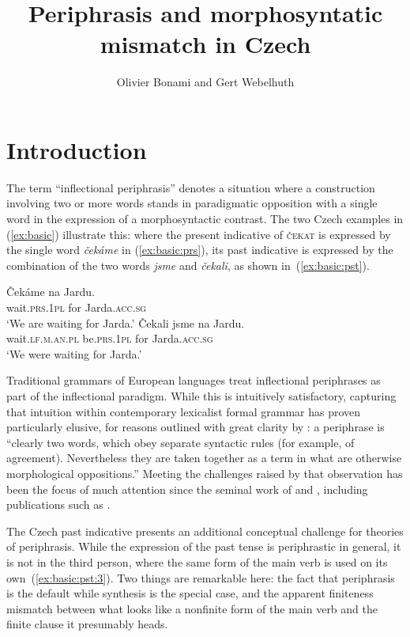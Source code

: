 \documentclass[output=paper]{langsci/langscibook}
\title{Periphrasis and morphosyntatic mismatch in Czech}
\author{Olivier Bonami\affiliation{Université de Paris, Laboratoire de linguistique formelle, CNRS}  and Gert  Webelhuth\affiliation{Goethe-Universität Frankfurt a.M.}}
\begin{document}
\maketitle

\section{Introduction}

The term ``inflectional periphrasis'' denotes a situation where a construction involving two or more words stands in paradigmatic opposition with a single word in the expression of a morphosyntactic contrast. The two Czech examples in (\ref{ex:basic}) illustrate this: where the present indicative of \textsc{čekat} is expressed by the single word \emph{čekáme} in (\ref{ex:basic:prs}), its past indicative is expressed by the combination of the two words \emph{jsme} and \emph{čekali}, as shown in~(\ref{ex:basic:pst}).

\begin{exe}
\ex\label{ex:basic}\begin{xlist}
\ex\label{ex:basic:prs}\gll Čekáme na Jardu.\\
wait.\textsc{prs.1pl} for Jarda.\textsc{acc.sg}\\
\glt ‘We are waiting for Jarda.’
\ex\label{ex:basic:pst}\gll Čekali jsme na Jardu.\\ 
wait.\textsc{lf.m.an.pl} be.\textsc{prs.1pl} for Jarda.\textsc{acc.sg}\\
\glt ‘We were waiting for Jarda.’
\end{xlist}
\end{exe}

Traditional grammars of European languages treat inflectional periphrases as part of the inflectional paradigm. While this is intuitively satisfactory, capturing that intuition within contemporary lexicalist formal grammar has proven particularly elusive, for reasons outlined with great clarity by \citet[219--220]{Matthews91}: a periphrase is ``clearly two words, which obey separate syntactic rules (for example, of agreement). Nevertheless they are taken together as a term in what are otherwise morphological oppositions.'' Meeting the challenges raised by that observation has been the focus of much attention since the seminal work of \citet{Vincent96} and \citet{Ackerman98}, including publications such as \citet{Sadler01,Ackerman04,Stump11,Brown12c,Bonami13,Popova13,Stump13,Dalrymple15,Bonami14d}.


The Czech past indicative presents an additional conceptual challenge for theories of periphrasis. While the expression of the past tense is periphrastic in general, it is not in the third person, where the same form of the main verb is used on its own~(\ref{ex:basic:pst:3}). Two things are remarkable here: the fact that periphrasis is the default while synthesis is the special case, and the apparent finiteness mismatch between what looks like a nonfinite form of the main verb and the finite clause it presumably heads.
\end{document}
